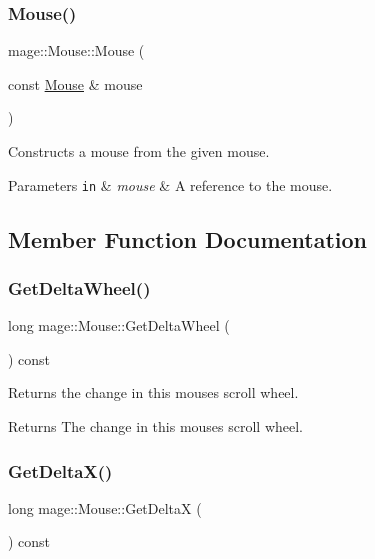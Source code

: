 \subsubsection{\texorpdfstring{Mouse()}{Mouse()}\hspace{0.1cm}{\footnotesize\ttfamily [2/2]}}
{\footnotesize\ttfamily mage\+::\+Mouse\+::\+Mouse (\begin{DoxyParamCaption}\item[{const \hyperlink{classmage_1_1_mouse}{Mouse} \&}]{mouse }\end{DoxyParamCaption})\hspace{0.3cm}{\ttfamily [private]}}

Constructs a mouse from the given mouse.


\begin{DoxyParams}[1]{Parameters}
\mbox{\tt in}  & {\em mouse} & A reference to the mouse. \\
\hline
\end{DoxyParams}


\subsection{Member Function Documentation}
\hypertarget{classmage_1_1_mouse_a898f4d0e645040c3a4121c2fe8119a89}{}\label{classmage_1_1_mouse_a898f4d0e645040c3a4121c2fe8119a89} 
\subsubsection{\texorpdfstring{Get\+Delta\+Wheel()}{GetDeltaWheel()}}
{\footnotesize\ttfamily long mage\+::\+Mouse\+::\+Get\+Delta\+Wheel (\begin{DoxyParamCaption}{ }\end{DoxyParamCaption}) const}

Returns the change in this mouse\textquotesingle{}s scroll wheel.

\begin{DoxyReturn}{Returns}
The change in this mouse\textquotesingle{}s scroll wheel. 
\end{DoxyReturn}
\hypertarget{classmage_1_1_mouse_a137313b065314d98c7b61eaefce6c3d1}{}\label{classmage_1_1_mouse_a137313b065314d98c7b61eaefce6c3d1} 
\subsubsection{\texorpdfstring{Get\+Delta\+X()}{GetDeltaX()}}
{\footnotesize\ttfamily long mage\+::\+Mouse\+::\+Get\+DeltaX (\begin{DoxyParamCaption}{ }\end{DoxyParamCaption}) const}

